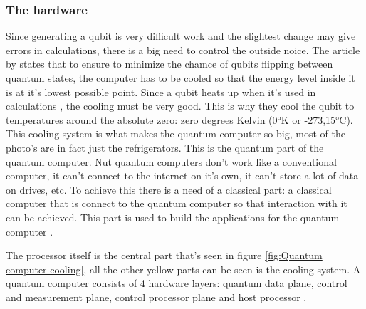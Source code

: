 \subsubsection{The hardware}
Since generating a qubit is very difficult work and the slightest change may give errors in calculations, there is a big need to control the outside noice.
The article by \textcite{Cooling} states that to ensure to minimize the chamce of qubits flipping between quantum states, the computer has to be cooled so that the energy level inside it is at it's lowest possible point.
Since a qubit heats up when it's used in calculations \autocite{Cooling}, the cooling must be very good. This is why they cool the qubit to temperatures around the absolute zero: zero degrees Kelvin (0°K or -273,15°C).
This cooling system is what makes the quantum computer so big, most of the photo's are in fact just the refrigerators. This is the quantum part of the quantum computer. Nut quantum computers don't work like a conventional computer, it can't connect to the internet on it's own, it can't store a lot of data on drives, etc.
To achieve this there is a need of a classical part: a classical computer that is connect to the quantum computer so that interaction with it can be achieved. This part is used to build the applications for the quantum computer \autocite{qhardware}.

The processor itself is the central part that's seen in figure \ref*{fig:Quantum computer cooling}, all the other yellow parts can be seen is the cooling system.
A quantum computer consists of 4 hardware layers: quantum data plane, control and measurement plane, control processor plane and host processor \autocite{qhardware}.

